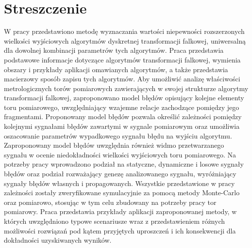 \chapter*{Streszczenie}

W pracy przedstawiono metodę wyznaczania wartości niepewności rozszerzonych wielkości wyjściowych algorytmów dyskretnej transformacji falkowej, uniwersalną dla dowolnej kombinacji parametrów tych algorytmów. Praca przedstawia podstawowe informacje dotyczące algorytmów transformacji falkowej, wymienia obszary i przykłady aplikacji omawianych algorytmów, a także przedstawia macierzowy sposób zapisu tych algorytmów. Aby umożliwić analizę właściwości metrologicznych torów pomiarowych zawierających w swojej strukturze algorytmy transformacji falkowej, zaproponowano model błędów opisujący kolejne elementy toru pomiarowego, uwzględniający wzajemne relacje zachodzące pomiędzy jego fragmentami. Proponowany model błędów pozwala określić zależności pomiędzy kolejnymi sygnałami błędów zawartymi w sygnale pomiarowym oraz umożliwia oszacowanie parametrów wypadkowego sygnału błędu na wyjściu algorytmu. Zaproponowany model błędów uwzględnia również widmo przetwarzanego sygnału w ocenie niedokładności wielkości wyjściowych toru pomiarowego. Na potrzeby pracy wprowadzono podział na statyczne, dynamiczne i losowe sygnały błędów oraz podział rozważający genezę analizowanego sygnału, wyróżniający sygnały błędów własnych i propagowanych. Wszystkie przedstawione w pracy zależności zostały zweryfikowane symulacyjnie za pomocą metody Monte-Carlo oraz pomiarowo, stosując w tym celu zbudowany na potrzeby pracy tor pomiarowy. Praca przedstawia przykłady aplikacji zaproponowanej metody, w których uwzględniono typowe scenariusze wraz z przedstawieniem różnych możliwości rozwiązań pod kątem przyjętych uproszczeń i ich konsekwencji dla dokładności uzyskiwanych wyników.
